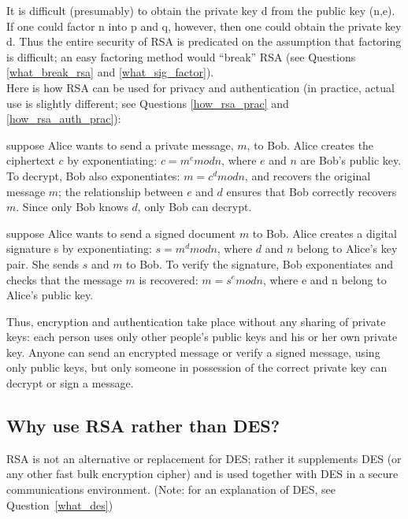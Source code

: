 It is difficult (presumably) to obtain the private key d from the public
key (n,e). If one could factor n into p and q, however, then one could
obtain the private key d. Thus the entire security of RSA is predicated on
the assumption that factoring is difficult; an easy factoring method would
``break'' RSA (see Questions \ref{what_break_rsa} and
\ref{what_sig_factor}).\\

Here is how RSA can be used for privacy and authentication (in practice,
actual use is slightly different; see Questions \ref{how_rsa_prac} and
\ref{how_rsa_auth_prac}):

\begin{htmllist}
  \item[RSA privacy (encryption):]
    
    suppose Alice wants to send a private message, $m$, to Bob. Alice
    creates the ciphertext $c$ by exponentiating: $c=m^e mod n$, where $e$
    and $n$ are Bob's public key. To decrypt, Bob also exponentiates:
    $m=c^d mod n$, and recovers the original message $m$; the relationship
    between $e$ and $d$ ensures that Bob correctly recovers $m$.  Since
    only Bob knows $d$, only Bob can decrypt.


  \item[RSA authentication:]
    
    suppose Alice wants to send a signed document $m$ to Bob. Alice creates
    a digital signature s by exponentiating: $s = m^d mod n$, where $d$ and
    $n$ belong to Alice's key pair. She sends $s$ and $m$ to Bob. To verify
    the signature, Bob exponentiates and checks that the message $m$ is
    recovered: $m=s^e mod n$, where e and n belong to Alice's public key.
\end{htmllist}

Thus, encryption and authentication take place without any sharing of
private keys: each person uses only other people's public keys and his
or her own private key. Anyone can send an encrypted message or verify
a signed message, using only public keys, but only someone in
possession of the correct private key can decrypt or sign a message.

\subsection{Why use RSA rather than DES?}

RSA is not an alternative or replacement for DES; rather it supplements
DES (or any other fast bulk encryption cipher) and is used together
with DES in a secure communications environment. (Note: for an
explanation of DES, see Question~\ref{what_des})\\

